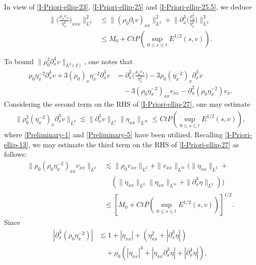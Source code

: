 \documentclass[11pt, reqno]{amsart}
\numberwithin{equation}{section}
\begin{document}
In view of \eqref{I-Priori-ellip-23}, \eqref{I-Priori-ellip-25} and \eqref{I-Priori-ellip-25.5}, we deduce
\begin{equation}\label{I-Priori-ellip-26}
\begin{aligned}
\bigg\|\bigg({\frac{\rho_0v_x}{\eta_x^2}}\bigg)_{xxx}\bigg\|_{L^2}^2
&\leq \|(\rho_0\partial_tv)_{xx}\|_{L^2}^2
+\bigg\|\partial_x^3\bigg(\frac{\rho_0^2}{\eta_x^2}\bigg)\bigg\|_{L^2}^2\\
&\leq M_0+Ct P(\sup_{0\leq s\leq t}E^{1/2}(s,v)).
\end{aligned}
\end{equation}

To bound \(\|\rho_0^2\partial_x^4v\big\|_{L^2(I)}\), one notes that
\begin{equation}\label{I-Priori-ellip-27}
\begin{aligned}
\rho_0\eta_x^{-2}\partial_x^4v+3(\rho_0)_x\eta_x^{-2}\partial_x^3v
&=\partial_x^3\bigg(\frac{\rho_0v_x}{\eta_x^2}\bigg)-3\rho_0(\eta_x^{-2})_x\partial_x^3v\\
&\quad-3(\rho_0\eta_x^{-2})_{xx}v_{xx}-\partial_x^3(\rho_0\eta_x^{-2})v_x.
\end{aligned}
\end{equation}
Considering the second term on the RHS of \eqref{I-Priori-ellip-27}, one may estimate
\begin{equation}\label{I-Priori-ellip-27.2}
\begin{aligned}
\|\rho_0^2(\eta_x^{-2})_{x}\partial_x^3v\|_{L^2}
\lesssim \|\partial_x^3v\|_{L^2}\|\eta_{xx}\|_{L^\infty}
\leq Ct P(\sup_{0\leq s\leq t}E^{1/2}(s,v)),
\end{aligned}
\end{equation}
where \eqref{Preliminary-1} and \eqref{Preliminary-5} have been utilized.
Recalling \eqref{I-Priori-ellip-13}, we may estimate the third term on the RHS of \eqref{I-Priori-ellip-27} as follows:
\begin{equation}\label{I-Priori-ellip-27.5}
\begin{aligned}
\|\rho_0(\rho_0\eta_x^{-2})_{xx}v_{xx}\|_{L^2}
&\lesssim \|\rho_0v_{xx}\|_{L^2}+
\|v_{xx}\|_{L^\infty}\big(\|\eta_{xx}\|_{L^2}+\\
&\quad(\|\eta_{xx}\|_{L^2}\|\eta_{xx}\|_{L^\infty}
+\|\partial_x^3\eta\|_{L^2})\big)\\
&\leq [M_0+Ct P(\sup_{0\leq s\leq t}E^{1/2}(s,v))]^{1/2}.
\end{aligned}
\end{equation}
Since
\begin{equation}\label{I-Priori-ellip-28}
\begin{aligned}
|\partial_x^3(\rho_0\eta_x^{-2})|
&\lesssim 1+|\eta_{xx}|+(\eta_{xx}^2+|\partial_x^3\eta|)\\
&\quad+\rho_0(|\eta_{xx}|^3+|\eta_{xx}\partial_x^3\eta|+|\partial_x^4\eta|),
\end{aligned}
\end{equation}
\end{document}

